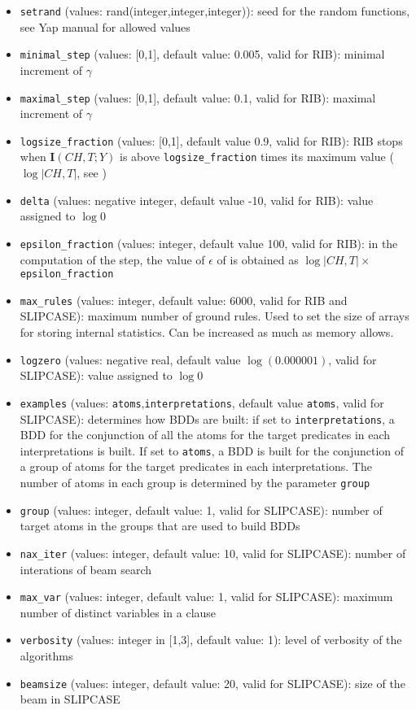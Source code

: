 \documentclass[a4paper,10pt]{article}
\begin{document}
\begin{itemize}
\item \verb|setrand| (values: rand(integer,integer,integer)): seed for the random functions, see Yap manual for allowed values
\item \verb|minimal_step| (values: [0,1], default value: 0.005, valid for RIB): minimal increment of $\gamma$
\item \verb|maximal_step| (values: [0,1], default value: 0.1, valid for RIB): maximal increment of $\gamma$
\item \verb|logsize_fraction| (values: [0,1], default value 0.9, valid for RIB): RIB stops when $\mathbf{I}(CH,T;Y)$ is above \verb|logsize_fraction| times its maximum value ($\log |CH,T|$, see \cite{DBLP:journals/jmlr/ElidanF05})
\item \verb|delta| (values: negative integer, default value -10, valid for RIB): value assigned to $\log 0$
\item \verb|epsilon_fraction| (values: integer, default value 100, valid for RIB): in the computation of the step, the value of $\epsilon$ of \cite{DBLP:journals/jmlr/ElidanF05} is obtained as $\log |CH,T|\times$\verb|epsilon_fraction|
\item \verb|max_rules| (values: integer, default value: 6000, valid for RIB and SLIPCASE): maximum number of ground rules. Used to set the size of arrays for storing internal statistics. Can be increased as much as memory allows.
\item \verb|logzero| (values: negative real, default value $\log(0.000001)$, valid for SLIPCASE): value assigned to $\log 0$
\item \verb|examples| (values: \verb|atoms|,\verb|interpretations|, default value \verb|atoms|, valid for SLIPCASE): determines how BDDs are built: if set to \verb|interpretations|, a BDD for the conjunction of all the atoms for the target predicates in each interpretations is built. 
If set to \verb|atoms|, a BDD is built for the conjunction of a group of atoms for the target predicates in each interpretations. The number of atoms in each group is determined by the parameter \verb|group|
\item \verb|group| (values: integer, default value: 1, valid for SLIPCASE): number of target atoms in the groups that are used to build BDDs
\item \verb|nax_iter| (values: integer, default value: 10, valid for SLIPCASE): number of interations of beam search
\item \verb|max_var| (values: integer, default value: 1, valid for SLIPCASE): maximum number of distinct variables in a clause
\item \verb|verbosity| (values: integer in [1,3], default value: 1): level of verbosity of the algorithms
\item \verb|beamsize|  (values: integer, default value: 20, valid for SLIPCASE): size of the beam in SLIPCASE
 
\end{itemize}
\end{document}
